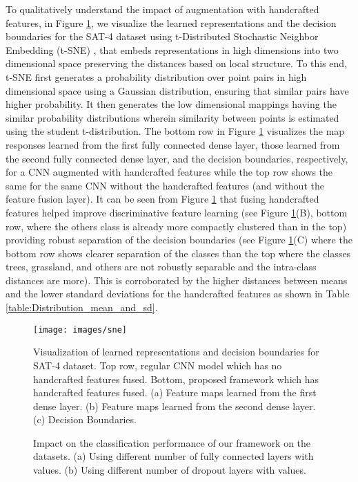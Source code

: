 \documentclass[]{interact}
\theoremstyle{plain}\newtheorem{theorem}{Theorem}[section]
\theoremstyle{definition}
\theoremstyle{remark}
\begin{document}
To qualitatively understand the impact of augmentation  with handcrafted features, in  Figure \ref{sne}, we visualize the learned representations and the decision boundaries   for the SAT-4 dataset  using t-Distributed Stochastic Neighbor Embedding (t-SNE) \citep{maaten2008visualizing}, that embeds  representations in high dimensions into two dimensional space preserving  the  distances  based on local structure. To this end, t-SNE first generates a probability distribution over point pairs in high dimensional space using  a Gaussian distribution, ensuring that similar pairs have higher probability. It then generates the low dimensional mappings having the similar probability distributions  wherein similarity between points is estimated using  the student t-distribution. 
The bottom  row in  Figure \ref{sne} visualizes the map responses learned from the first fully connected dense layer, those learned from the second fully connected dense layer, and the decision boundaries, respectively,  for a CNN augmented with handcrafted features while the top row shows the same for the same CNN without the handcrafted features (and without the feature fusion layer).  It can be seen from Figure \ref{sne}   that  fusing  handcrafted features helped  improve discriminative  feature learning (see Figure \ref{sne}(B), bottom row,  where the others class is already  more compactly clustered than in the top)  providing robust separation of the decision boundaries  (see Figure \ref{sne}(C) where the bottom row shows clearer separation of the classes than the top where the classes trees, grassland, and others are not robustly separable and the intra-class distances are more). This is corroborated by the higher distances between means and the lower standard deviations for the handcrafted features as shown in Table \ref{table:Distribution_mean_and_sd}. 

\begin{figure}[t]
  \centering
    \texttt{[image: images/sne]}
  \caption{Visualization of learned representations and decision boundaries for SAT-4 dataset. Top row, regular CNN model which has no handcrafted features fused. Bottom, proposed framework which has handcrafted features fused. (a) Feature maps learned from the first dense layer. (b) Feature maps learned from the second dense layer. (c) Decision Boundaries.} \label{sne}
\end{figure}

\begin{figure}[t]
\centering
{}
\hspace{10pt}

\caption[Optional caption for list of figures]{Impact on the classification performance of our framework on the datasets. (a) Using different number of fully connected layers with values. (b) Using different number of dropout layers with values.}
\label{fig:performance}
\end{figure}
\end{document}
